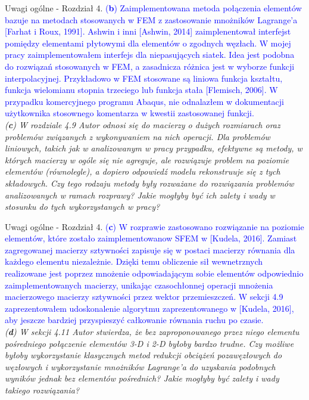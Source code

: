 \documentclass[10pt,aspectratio=169]{beamer} %
\begin{document}
\begin{frame}[label=frame9]{Uwagi ogólne - Rozdział 4.}\justifying
\textcolor{blue}{(\textbf{b}) Zaimplementowana metoda połączenia elementów bazuje na metodach stosowanych w FEM z zastosowanie mnożników Lagrange'a [Farhat i Roux, 1991]. Ashwin i inni [Ashwin, 2014] zaimplenentował interfejst pomiędzy elementami płytowymi dla elementów o zgodnych węzłach. W mojej pracy zaimplementowałem interfejs dla niepasujących siatek. Idea jest podobna do rozwiązań stosowanych w FEM, a zasadnicza różnica jest w wyborze funkcji interpolacyjnej. Przykładowo w FEM stosowane są liniowa funkcja kształtu, funkcja wielomianu stopnia trzeciego lub funkcja stała [Flemisch, 2006]. W przypadku komercyjnego programu Abaqus, nie odnalazłem w dokumentacji użytkownika stosownego komentarza w kwestii zastosowanej funkcji.\\}
\textit{(\textbf{c}) W rozdziale 4.9 Autor odnosi się do macierzy o dużych rozmiarach oraz problemów związanych z wykonywaniem na nich operacji. Dla problemów liniowych, takich jak w analizowanym w pracy przypadku, efektywne są metody, w których macierzy w ogóle się nie agreguje, ale rozwiązuje problem na poziomie elementów (równolegle), a dopiero odpowiedź modelu rekonstruuje się z tych składowych. Czy tego rodzaju metody były rozważane do rozwiązania problemów analizowanych w ramach rozprawy? Jakie mogłyby być ich zalety i wady w stosunku do tych wykorzystanych w pracy?\\}
\end{frame}
\begin{frame}[label=frame10]{Uwagi ogólne - Rozdział 4.}\justifying
\textcolor{blue}{(\textbf{c})  W rozprawie zastosowano rozwiązanie na poziomie elementów, które zostało zaimplementowanow SFEM w [Kudela, 2016]. Zamiast zagregowanej macierzy sztywności zapisuje się w postaci macierzy równania dla każdego elementu niezależnie. Dzięki temu obliczenie sił wewnetrznych realizowane jest poprzez mnożenie odpowiadającym sobie elementów odpowiednio zaimplementowanych macierzy, unikając czasochłonnej operacji mnożenia macierzowego macierzy sztywności przez wektor przemieszczeń. W sekcji 4.9 zaprezentowałem udoskonalenie algorytmu zaprezentowanego w [Kudela, 2016], aby jeszcze bardziej przyspieszyć całkowanie równania ruchu po czasie.}\\
\textit{(\textbf{d}) W sekcji 4.11 Autor stwierdza, że bez zaproponowanego przez niego elementu pośredniego połączenie elementów 3-D i 2-D byłoby bardzo trudne. Czy możliwe byłoby wykorzystanie klasycznych metod redukcji obciążeń pozawęzłowych do węzłowych i wykorzystanie mnożników Lagrange’a do uzyskania podobnych wyników jednak bez elementów pośrednich? Jakie mogłyby być zalety i wady takiego rozwiązania?}
\end{frame}
\end{document}
